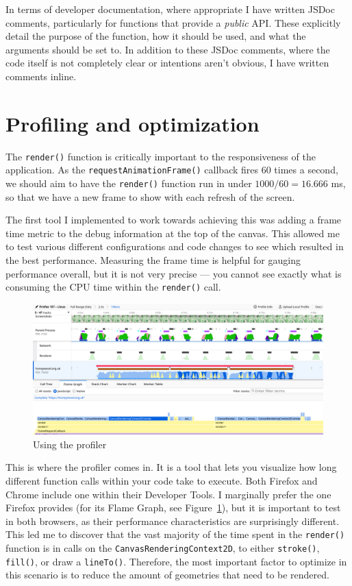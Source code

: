 \documentclass{final_report}
\begin{document}
In terms of developer documentation, where appropriate I have written JSDoc comments, particularly for functions that provide a \emph{public} API\@. These explicitly detail the purpose of the function, how it should be used, and what the arguments should be set to. In addition to these JSDoc comments, where the code itself is not completely clear or intentions aren't obvious, I have written comments inline.

\section{Profiling and optimization}\label{sec:profiling}

The \texttt{render()} function is critically important to the responsiveness of the application. As the \texttt{requestAnimationFrame()} callback fires 60 times a second, we should aim to have the \texttt{render()} function run in under \(1000/60=16.666\) ms, so that we have a new frame to show with each refresh of the screen. 

The first tool I implemented to work towards achieving this was adding a frame time metric to the debug information at the top of the canvas. This allowed me to test various different configurations and code changes to see which resulted in the best performance. Measuring the frame time is helpful for gauging performance overall, but it is not very precise --- you cannot see exactly what is consuming the CPU time within the \texttt{render()} call.

\begin{figure}[ht]
    \centering
    \includegraphics[width=\textwidth]{../proof-of-concepts/4-rendering-osm-data/screenshots/profiling.png}
    \caption{Using the profiler}\label{fig:profiling}
\end{figure}

This is where the profiler comes in. It is a tool that lets you visualize how long different function calls within your code take to execute. Both Firefox and Chrome include one within their Developer Tools. I marginally prefer the one Firefox provides (for its Flame Graph, see Figure~\ref{fig:profiling}), but it is important to test in both browsers, as their performance characteristics are surprisingly different. This led me to discover that the vast majority of the time spent in the \texttt{render()} function is in calls on the \texttt{CanvasRenderingContext2D}, to either \texttt{stroke()}, \texttt{fill()}, or draw a \texttt{lineTo()}. Therefore, the most important factor to optimize in this scenario is to reduce the amount of geometries that need to be rendered.
\end{document}

